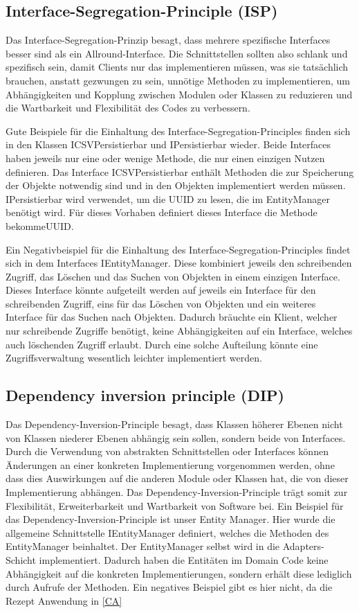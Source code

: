 \subsection{Interface-Segregation-Principle (ISP)}
Das Interface-Segregation-Prinzip besagt, dass mehrere spezifische Interfaces besser sind als ein Allround-Interface. Die Schnittstellen sollten also schlank und spezifisch sein, damit Clients nur das implementieren müssen, was sie tatsächlich brauchen, anstatt gezwungen zu sein, unnötige Methoden zu implementieren, um Abhängigkeiten und Kopplung zwischen Modulen oder Klassen zu reduzieren und die Wartbarkeit und Flexibilität des Codes zu verbessern.

Gute Beispiele für die Einhaltung des Interface-Segregation-Principles finden sich in den Klassen ICSVPersistierbar und IPersistierbar wieder.
Beide Interfaces haben jeweils nur eine oder wenige Methode, die nur einen einzigen Nutzen definieren. Das Interface ICSVPersistierbar enthält Methoden die zur Speicherung der Objekte notwendig sind und in den Objekten implementiert werden müssen. IPersistierbar wird verwendet, um die UUID zu lesen, die im EntityManager benötigt wird. Für dieses Vorhaben definiert dieses Interface die Methode bekommeUUID.

Ein Negativbeispiel für die Einhaltung des Interface-Segregation-Principles findet sich in dem Interfaces IEntityManager. Diese kombiniert jeweils den schreibenden Zugriff, das Löschen und das Suchen von Objekten in einem einzigen Interface. Dieses Interface könnte aufgeteilt werden auf jeweils ein Interface für den schreibenden Zugriff, eins für das Löschen von Objekten und ein weiteres Interface für das Suchen nach Objekten. Dadurch bräuchte ein Klient, welcher nur schreibende Zugriffe benötigt, keine Abhängigkeiten auf ein Interface, welches auch löschenden Zugriff erlaubt. Durch eine solche Aufteilung könnte eine Zugriffsverwaltung wesentlich leichter implementiert werden.
\subsection{Dependency inversion principle (DIP)}
Das Dependency-Inversion-Principle besagt, dass Klassen höherer Ebenen nicht von Klassen niederer Ebenen abhängig sein sollen, sondern beide von Interfaces. Durch die Verwendung von abstrakten Schnittstellen oder Interfaces können Änderungen an einer konkreten Implementierung vorgenommen werden, ohne dass dies Auswirkungen auf die anderen Module oder Klassen hat, die von dieser Implementierung abhängen. Das Dependency-Inversion-Principle trägt somit zur Flexibilität, Erweiterbarkeit und Wartbarkeit von Software bei.
Ein Beispiel für das Dependency-Inversion-Principle ist unser Entity Manager. Hier wurde die allgemeine Schnittstelle IEntityManager definiert, welches die Methoden des EntityManager beinhaltet. Der EntityManager selbst wird in die Adapters-Schicht implementiert. Dadurch haben die Entitäten im Domain Code keine Abhängigkeit auf die konkreten Implementierungen, sondern erhält diese lediglich durch Aufrufe der Methoden. Ein negatives Beispiel gibt es hier nicht, da die Rezept Anwendung in \autoref{CA} 

